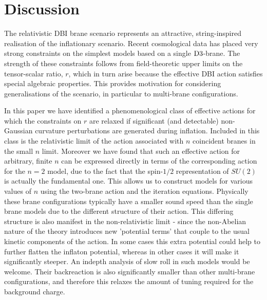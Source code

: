 {%
% 
% 
\section{Discussion}
\label{sec:multi-disc}


The relativistic DBI brane scenario represents an attractive, 
string-inspired realisation of the inflationary scenario. Recent
cosmological data has placed very strong constraints on the simplest 
models based on a single ${\rm D3}$-brane. The strength 
of these constraints follows from field-theoretic upper limits 
on the tensor-scalar ratio, $r$, which in turn arise because 
the effective DBI action satisfies special  
algebraic properties. This provides motivation 
for considering generalisations of the scenario, in particular to 
multi-brane configurations. 

In this paper we have identified a phenomenological class of 
effective actions for which the constraints 
on $r$ are relaxed if significant (and detectable) 
non-Gaussian curvature perturbations are generated during inflation. 
Included in this class is the relativistic limit of the 
action associated with $n$ 
coincident branes in the small $n$ limit. Moreover 
we have found that such an effective action for arbitrary, finite $n$ 
can be expressed directly in terms of the corresponding action 
for the $n = 2$ model, due to the fact that the spin-$1/2$ representation
of $SU(2)$ is actually the fundamental one. This allows us to construct models for various values of
$n$ using the
two-brane action and the iteration equations.
Physically these brane configurations typically 
have a smaller sound speed than the single brane models due to
the different structure of their action. This differing structure is also
manifest in the non-relativistic limit - since the non-Abelian nature of the theory
introduces new 'potential terms' that couple to the usual kinetic components of the 
action. In some cases this extra potential could help to further flatten the inflaton potential, 
whereas in other cases it will make it significantly steeper. An indepth analysis of slow roll in
such models would be welcome.
Their backreaction is also significantly smaller than other multi-brane 
configurations, and therefore this relaxes the amount of tuning 
required for the background charge.

}
